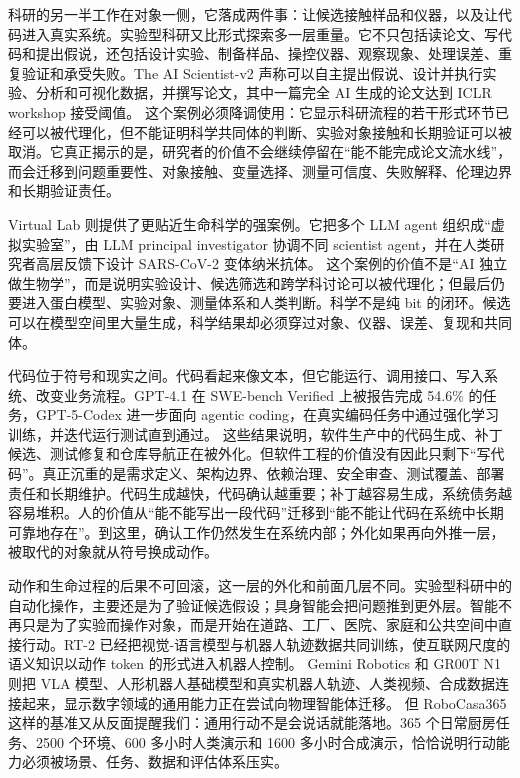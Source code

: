 
科研的另一半工作在对象一侧，它落成两件事：让候选接触样品和仪器，以及让代码进入真实系统。实验型科研又比形式探索多一层重量。它不只包括读论文、写代码和提出假说，还包括设计实验、制备样品、操控仪器、观察现象、处理误差、重复验证和承受失败。The AI Scientist-v2 声称可以自主提出假说、设计并执行实验、分析和可视化数据，并撰写论文，其中一篇完全 AI 生成的论文达到 ICLR workshop 接受阈值。\cite{yamada2025aiscientistv2} 这个案例必须降调使用：它显示科研流程的若干形式环节已经可以被代理化，但不能证明科学共同体的判断、实验对象接触和长期验证可以被取消。它真正揭示的是，研究者的价值不会继续停留在“能不能完成论文流水线”，而会迁移到问题重要性、对象接触、变量选择、测量可信度、失败解释、伦理边界和长期验证责任。

Virtual Lab 则提供了更贴近生命科学的强案例。它把多个 LLM agent 组织成“虚拟实验室”，由 LLM principal investigator 协调不同 scientist agent，并在人类研究者高层反馈下设计 SARS-CoV-2 变体纳米抗体。\cite{swanson2025virtuallab} 这个案例的价值不是“AI 独立做生物学”，而是说明实验设计、候选筛选和跨学科讨论可以被代理化；但最后仍要进入蛋白模型、实验对象、测量体系和人类判断。科学不是纯 bit 的闭环。候选可以在模型空间里大量生成，科学结果却必须穿过对象、仪器、误差、复现和共同体。

代码位于符号和现实之间。代码看起来像文本，但它能运行、调用接口、写入系统、改变业务流程。GPT-4.1 在 SWE-bench Verified 上被报告完成 54.6\% 的任务，GPT-5-Codex 进一步面向 agentic coding，在真实编码任务中通过强化学习训练，并迭代运行测试直到通过。\cite{openai2025gpt41,openai2025gpt5codex} 这些结果说明，软件生产中的代码生成、补丁候选、测试修复和仓库导航正在被外化。但软件工程的价值没有因此只剩下“写代码”。真正沉重的是需求定义、架构边界、依赖治理、安全审查、测试覆盖、部署责任和长期维护。代码生成越快，代码确认越重要；补丁越容易生成，系统债务越容易堆积。人的价值从“能不能写出一段代码”迁移到“能不能让代码在系统中长期可靠地存在”。到这里，确认工作仍然发生在系统内部；外化如果再向外推一层，被取代的对象就从符号换成动作。


动作和生命过程的后果不可回滚，这一层的外化和前面几层不同。实验型科研中的自动化操作，主要还是为了验证候选假设；具身智能会把问题推到更外层。智能不再只是为了实验而操作对象，而是开始在道路、工厂、医院、家庭和公共空间中直接行动。RT-2 已经把视觉-语言模型与机器人轨迹数据共同训练，使互联网尺度的语义知识以动作 token 的形式进入机器人控制。\cite{zitkovich2023rt2} Gemini Robotics 和 GR00T N1 则把 VLA 模型、人形机器人基础模型和真实机器人轨迹、人类视频、合成数据连接起来，显示数字领域的通用能力正在尝试向物理智能体迁移。\cite{geminirobotics2025,nvidia2025gr00t} 但 RoboCasa365 这样的基准又从反面提醒我们：通用行动不是会说话就能落地。365 个日常厨房任务、2500 个环境、600 多小时人类演示和 1600 多小时合成演示，恰恰说明行动能力必须被场景、任务、数据和评估体系压实。\cite{nasiriany2026robocasa365}

